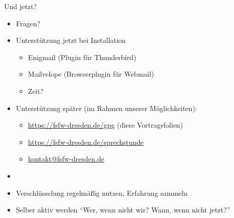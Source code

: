 \documentclass{beamer}
\begin{document}
\begin{frame}[label=uj]{Und jetzt?}
\begin{itemize}
 \item Fragen?\\[10mm]
 \item Unterstützung jetzt bei Installation
 \begin{itemize}
  \item Enigmail (Plugin für Thunderbird)
  \item Mailvelope (Browserplugin für Webmail)
  \item \scalebox{1.9}{$\triangle$}\hspace{-1.0em}\raisebox{.2em}{!} \hspace{0.5em} Zeit?\\[5mm]
  \pause
  \end{itemize}
  \item Unterstützung später {\tiny (im Rahmen unserer Möglichkeiten)}:
  \begin{itemize}
   \item \url{https://fsfw-dresden.de/gpg} (diese Vortragsfolien)
   \item \url{https://fsfw-dresden.de/sprechstunde}
   \item \url{kontakt@fsfw-dresden.de}
  
 \end{itemize}
 \pause
 \item[]
 \item Verschlüsselung regelmäßig nutzen, Erfahrung sammeln
 \item Selber aktiv werden {\tiny "`Wer, wenn nicht wir? Wann, wenn nicht jetzt?"'}

\end{itemize}



\end{frame}

\end{document}
